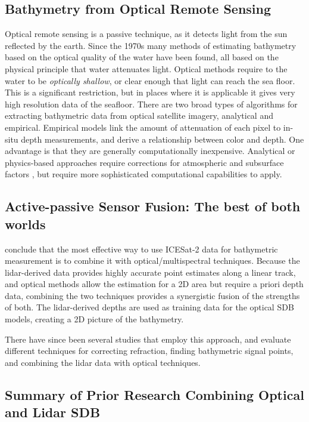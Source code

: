 \subsection{Bathymetry from Optical Remote Sensing}
Optical remote sensing is a passive technique, as it detects light from the sun reflected by the earth. Since the 1970s many methods of estimating bathymetry based on the optical quality of the water have been found, all based on the physical principle that water attenuates light. Optical methods require to the water to be \emph{optically shallow}, or clear enough that light can reach the sea floor. This is a significant restriction, but in places where it is applicable it gives very high resolution data of the seafloor. There are two broad types of algorithms for extracting bathymetric data from optical satellite imagery, analytical and empirical. Empirical models link the amount of attenuation of each pixel to in-situ depth measurements, and derive a relationship between color and depth. One advantage is that they are generally computationally inexpensive. Analytical or physics-based approaches require corrections for atmospheric and subsurface factors \parencite{Turner2021}, but require more sophisticated computational capabilities to apply.


\subsection{Active-passive Sensor Fusion: The best of both worlds}
\cite{Parrish2019} conclude that the most effective way to use ICESat-2 data for bathymetric measurement is to combine it with optical/multispectral techniques. Because the lidar-derived data provides highly accurate point estimates along a linear track, and optical methods allow the estimation for a 2D area but require a priori depth data, combining the two techniques provides a synergistic fusion of the strengths of both. The lidar-derived depths are used as training data for the optical SDB models, creating a 2D picture of the bathymetry.

There have since been several studies that employ this approach, and evaluate different techniques for correcting refraction, finding bathymetric signal points, and combining the lidar data with optical techniques.

\subsection{Summary of Prior Research Combining Optical and Lidar SDB}

